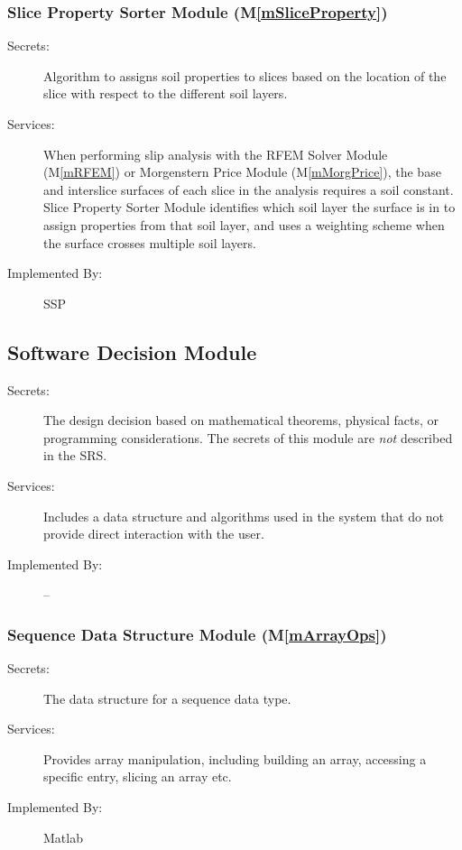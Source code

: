 \documentclass[12pt]{article}
\newcommand{\progname}{SSP}
\newcommand{\mref}[1]{M\ref{#1}}
\begin{document}
\subsubsection{Slice Property Sorter Module (\mref{mSliceProperty})}
\begin{description}
\item[Secrets:] Algorithm to assigns soil properties to slices based
  on the location of the slice with respect to the different soil
  layers.
\item[Services:] When performing slip analysis with the RFEM Solver
  Module (\mref{mRFEM}) or Morgenstern Price Module
  (\mref{mMorgPrice}), the base and interslice surfaces of each slice
  in the analysis requires a soil constant. Slice Property Sorter
  Module identifies which soil layer the surface is in to assign
  properties from that soil layer, and uses a weighting scheme when
  the surface crosses multiple soil layers.
\item[Implemented By:] \progname
\end{description} 


\subsection{Software Decision Module}

\begin{description}
\item[Secrets:] The design decision based on mathematical theorems,
  physical facts, or programming considerations. The secrets of this
  module are \emph{not} described in the SRS.
\item[Services:] Includes a data structure and algorithms used in the
  system that do not provide direct interaction with the user.
\item[Implemented By:] --
\end{description}


\subsubsection{Sequence Data Structure Module (\mref{mArrayOps})}

\begin{description}
\item[Secrets:] The data structure for a sequence data type.
\item[Services:] Provides array manipulation, including building an
  array, accessing a specific entry, slicing an array etc.
\item[Implemented By:] Matlab
\end{description}
\end{document}
